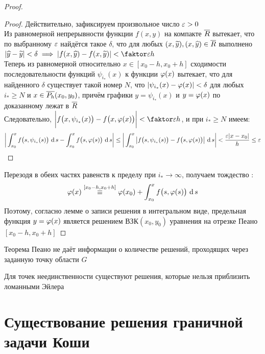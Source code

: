 \begin{proof}
\begin{statement}
    \end{statement}
    \begin{proof}
        Действительно, зафиксируем произвольное число $ \veps > 0 $ \\
        Из равномерной непрерывности функции $ f(x, y) $ на компакте $ \ol{R} $ вытекает, что по выбранному $ \veps $ найдётся такое $ \delta $, что для любых $ (x, \vawe{y}), (x, \hat{y}) \in \ol{R} $ выполнено $ |\hat{y} - \vawe{y}| < \delta \implies |f(x, \hat{y}) - f(x, \vawe{y})| < \faktor\veps{h} $ \\
        Теперь из равномерной относительно $ x \in [x_0 - h, x_0 + h] $ сходимости последовательности функций $ \psi_{i_*}(x) $ к функции $ \vphi(x) $ вытекает, что для найденного $ \delta $ существует такой номер $ N $, что $ |\psi_{i_*}(x) - \vphi(x)| < \delta $ для любых $ i_* \ge N $ и $ x \in \ol{P_h}(x_0, y_0) $, причём графики $ y = \psi_{i_*}(x) $ и $ y = \vphi(x) $ по доказанному лежат в $ \ol{R} $ \\
        Следовательно, $ \bigg| f \big(x, \psi_{i_*}(x) \big) - f \big( x, \vphi(x) \big) \bigg| < \faktor\veps{h} $, и при $ i_* \ge N $ имеем:
        $$ \bigg| \dint[s]{x_0}x{f \big( s, \psi_{i_*}(s) \big)} - \dint[s]{x_0}x{f \big( s, \vphi(s) \big)} \bigg| \le \bigg| \dint[s]{x_0}x{\big| f \big(s, \psi_{i_*}(s) \big) - f \big( s, \vphi(s) \big) \big|} \bigg| < \frac{\veps|x - x_0|}h \le \veps $$
    \end{proof}
    Перезодя в обеих частях равенств  к пределу при $ i_* \to \infty $, получаем тождество :
    $$ \vphi(x) \overset{[x_0 - h, x_0 + h]}\equiv \vphi(x_0) + \dint[s]{x_0}x{f \big(s, \vphi(s) \big)} $$
    Поэтому, согласно лемме о записи решения в интегральном виде, предельная функция $ y = \vphi(x) $ является решением ВЗК$ (x_0, y_0) $ уравнения  на отрезке Пеано $ [x_0 - h, x_0 + h] $
\end{proof}

\begin{remark}
	Теорема Пеано не даёт информации о количестве решений, проходящих через заданную точку области $ G $
\end{remark}

\begin{remark}
	Для точек неединственности существуют решения, которые нельзя приблизить ломанными Эйлера
\end{remark}

\section{Существование решения граничной задачи Коши}

